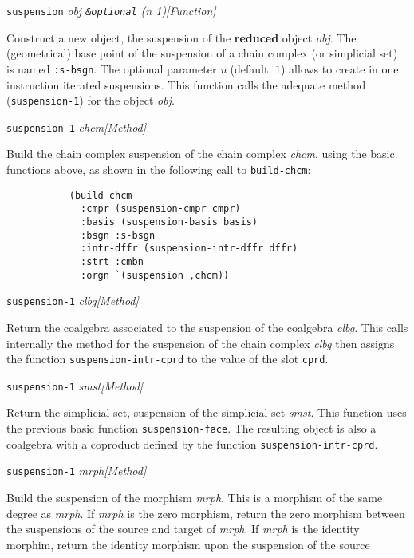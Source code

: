\newpage
{\parindent=0mm
{\leftskip=5mm
{\tt suspension} {\em obj {\tt \&optional} (n 1)}\hfill{\em[Function]} \par}
{\leftskip=15mm
Construct a new object, the suspension of the {\bf reduced} object {\em obj}.
The (geometrical) base point of the suspension of a chain complex
(or simplicial set) is named  {\tt :s-bsgn}. The optional parameter {\em n} (default: $1$)
allows to create in one instruction iterated suspensions. This function calls the adequate
method ({\tt suspension-1}) for the object {\em obj}.\par}
{\leftskip=5mm
{\tt suspension-1} {\em chcm}\hfill{\em[Method]} \par}
{\leftskip=15mm
Build the chain complex suspension of the chain complex {\em chcm}, using the basic functions
above, as shown in the following call to {\tt build-chcm}:
{\footnotesize\begin{verbatim}
           (build-chcm
             :cmpr (suspension-cmpr cmpr)
             :basis (suspension-basis basis)
             :bsgn :s-bsgn
             :intr-dffr (suspension-intr-dffr dffr)
             :strt :cmbn
             :orgn `(suspension ,chcm))
\end{verbatim}}
\par}
{\leftskip=5mm
{\tt suspension-1} {\em clbg}\hfill{\em[Method]} \par}
{\leftskip=15mm
Return the coalgebra associated to the suspension of the coalgebra {\em clbg}.
This calls internally the method for the suspension of the chain complex {\em clbg} then
assigns the function {\tt suspension-intr-cprd} to the value of the slot {\tt cprd}. \par}
{\leftskip=5mm
{\tt suspension-1} {\em smst}\hfill{\em[Method]} \par}
{\leftskip=15mm
Return the simplicial set, suspension of the simplicial set {\em smst}.
This function uses the previous basic function {\tt suspension-face}.
The resulting object is also a coalgebra with a coproduct defined by the
function {\tt suspension-intr-cprd}. \par}
{\leftskip=5mm
{\tt suspension-1} {\em mrph}\hfill{\em[Method]} \par}
{\leftskip=15mm
Build the suspension of the morphism {\em mrph}. This is a morphism of the same
degree as {\em mrph}. If {\em mrph} is the zero morphism, return the zero morphism
between the suspensions of the source and target of {\em mrph}. If {\em mrph} is the
identity morphim, return the identity morphism upon the suspension of the source
}}
